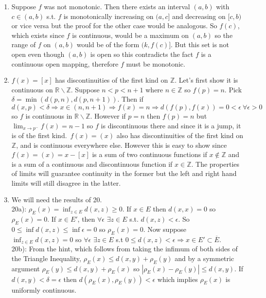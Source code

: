 \documentclass{article}
\begin{document}
\begin{enumerate}
\item Suppose $f$ was not monotonic. Then there exists an interval $(a,b)$ with $c\in (a, b)$ s.t. $f$ is monotonically increasing on $(a,c]$ and decreasing on $[c, b)$ or vice versa but the proof for the other case would be analogous. So $f(c)$, which exists since $f$ is continuous, would be a maximum on $(a, b)$ so the range of $f$ on $(a, b)$ would be of the form $(k, f(c)]$. But this set is not open even though $(a, b)$ is open so this contradicts the fact $f$ is a continuous open mapping, therefore $f$ must be monotonic. \
\item $f(x)=[x]$ has discontinuities of the first kind on $\mathbb{Z}$. Let's first show it is continuous on $\mathbb{R}\backslash \mathbb{Z}$. Suppose $n < p < n+1$ where $n\in\mathbb{Z}$ so $f(p)=n$. Pick $\delta = \min(d(p, n), d(p, n+1))$. Then if $d(x,p) < \delta \Rightarrow x\in (n, n+1) \Rightarrow f(x)=n \Rightarrow d(f(p), f(x)) = 0 < \epsilon \ \forall \epsilon >0$ so $f$ is continuous in $\mathbb{R}\backslash\mathbb{Z}$. However if $p=n$ then $f(p)=n$ but $\displaystyle\lim_{x\rightarrow p^{-}} f(x) = n-1$ so $f$ is discontinuous there and since it is a jump, it is of the first kind.\
$f(x)=(x)$ also has discontinuities of the first kind on $\mathbb{Z}$, and is continuous everywhere else. However this is easy to show since $f(x)=(x)=x-[x]$ is a sum of two continuous functions if $x\notin\mathbb{Z}$ and is a sum of a continuous and discontinuous function if $x\in\mathbb{Z}$. The properties of limits will guarantee continuity in the former but the left and right hand limits will still disagree in the latter. \
\setcounter{enumi}{21}
\item We will need the results of 20. \\
20a): $\rho_{E} (x) = \displaystyle\inf_{z\in E} d(x, z)\geq 0$. If $x\in E$ then $d(x, x)=0$ so $\rho_{E} (x) = 0$. If $x\in E'$, then $\forall\epsilon$ $\exists z\in E$ s.t. $d(x, z) < \epsilon$. So $0 \leq \displaystyle\inf d(x, z)\leq\displaystyle\inf \epsilon = 0$ so $\rho_{E} (x) = 0$. Now suppose $\displaystyle\inf_{z\in E} d(x, z) = 0$ so $\forall \epsilon$ $\exists z\in E$ s.t $0\leq d(x,z) < \epsilon \Rightarrow x\in E'\subset\overline{E}$. \\
20b): From the hint, which follows from taking the infimum of both sides of the Triangle Inequality, $\rho_{E} (x) \leq d(x,y) +\rho_{E} (y)$ and by a symmetric argument $\rho_{E} (y) \leq d(x,y) +\rho_{E} (x)$ so $|\rho_{E} (x) - \rho_{E} (y)| \leq d(x,y)$. If $d(x,y)<\delta = \epsilon$ then $d(\rho_{E} (x), \rho_{E} (y)) < \epsilon$ which implies $\rho_{E} (x)$ is uniformly continuous. \\

\end{enumerate}
\end{document}
